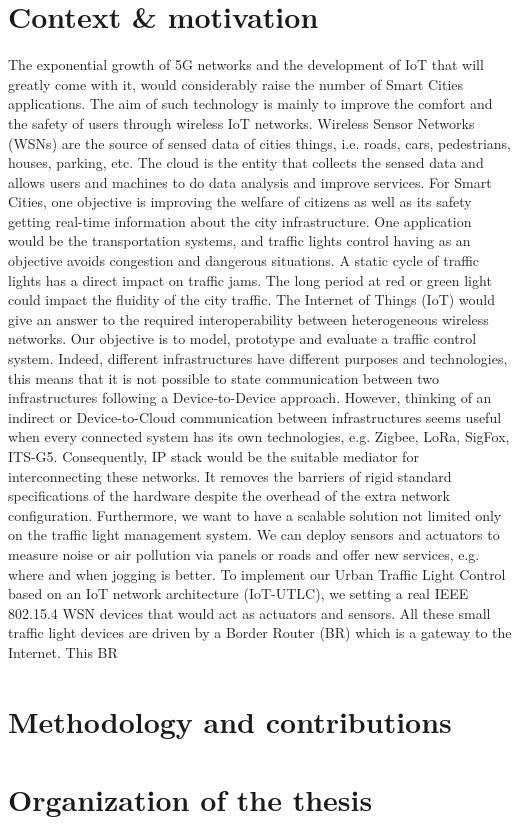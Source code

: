 \section{Context \& motivation}

The exponential growth of 5G networks and the development of IoT that will greatly come with it,
	would considerably raise the number of Smart Cities applications.
The aim of such technology is mainly to improve the comfort and the safety of users through wireless IoT networks.
Wireless Sensor Networks (WSNs) are the source of sensed data of cities things,
	i.e.
roads,
	cars,
	pedestrians,
	houses,
	parking,
	etc.
The cloud is the entity that collects the sensed data and allows users and machines to do data analysis and improve services.
For Smart Cities,
	one objective is improving the welfare of citizens as well as its safety getting real-time information about the city infrastructure.
One application would be the transportation systems,
	and traffic lights control having as an objective avoids congestion and dangerous situations.
A static cycle of traffic lights has a direct impact on traffic jams.
The long period at red or green light could impact the fluidity of the city traffic.
The Internet of Things (IoT) would give an answer to the required interoperability between heterogeneous wireless networks.
Our objective is to model,
	prototype and evaluate a traffic control system.
Indeed,
	different infrastructures have different purposes and technologies,
	this means that it is not possible to state communication between two infrastructures following a Device-to-Device approach.
However,
	thinking of an indirect or Device-to-Cloud communication between infrastructures seems useful when every connected system has its own technologies,
	e.g.
Zigbee,
	LoRa,
	SigFox,
	ITS-G5.
Consequently,
	IP stack would be the suitable mediator for interconnecting these networks.
It removes the barriers of rigid standard specifications of the hardware despite the overhead of the extra network configuration.
Furthermore,
	we want to have a scalable solution not limited only on the traffic light management system.
We can deploy sensors and actuators to measure noise or air pollution via panels or roads and offer new services,
	e.g.
where and when jogging is better.
To implement our Urban Traffic Light Control based on an IoT network architecture (IoT-UTLC),
	we setting a real IEEE 802.15.4 WSN devices that would act as actuators and sensors.
All these small traffic light devices are driven by a Border Router (BR) which is a gateway to the Internet.
This BR 

\section{Methodology and contributions}

\section{Organization of the thesis}




